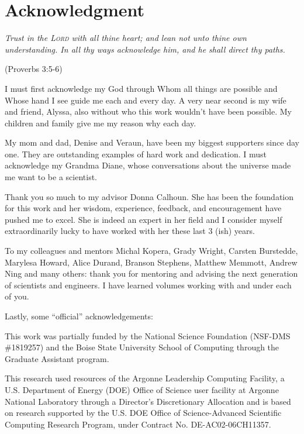 \chapter*{Acknowledgment}

\begin{center}
{\em Trust in the \textsc{Lord} with all thine heart; and lean not unto thine own understanding. In all thy ways acknowledge him, and he shall direct thy paths.}

(Proverbs 3:5-6)
\end{center}

I must first acknowledge my God through Whom all things are possible and Whose hand I see guide me each and every day. A very near second is my wife and friend, Alyssa, also without who this work wouldn't have been possible. My children and family give me my reason why each day.

My mom and dad, Denise and Veraun, have been my biggest supporters since day one. They are outstanding examples of hard work and dedication. I must acknowledge my Grandma Diane, whose conversations about the universe made me want to be a scientist.

Thank you so much to my advisor Donna Calhoun. She has been the foundation for this work and her wisdom, experience, feedback, and encouragement have pushed me to excel. She is indeed an expert in her field and I consider myself extraordinarily lucky to have worked with her these last 3 (ish) years.

To my colleagues and mentors Michal Kopera, Grady Wright, Carsten Burstedde, Marylesa Howard, Alice Durand, Branson Stephens, Matthew Memmott, Andrew Ning and many others: thank you for mentoring and advising the next generation of scientists and engineers. I have learned volumes working with and under each of you.

Lastly, some ``official'' acknowledgements:

This work was partially funded by the National Science Foundation (NSF-DMS \#1819257) and the Boise State University School of Computing through the Graduate Assistant program.

This research used resources of the Argonne Leadership Computing Facility, a U.S. Department of Energy (DOE) Office of Science user facility at Argonne National Laboratory through a Director's Discretionary Allocation and is based on research supported by the U.S. DOE Office of Science-Advanced Scientific Computing Research Program, under Contract No. DE-AC02-06CH11357.

